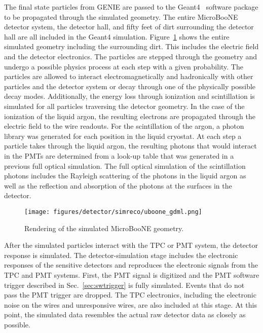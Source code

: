     The final state particles from GENIE are passed to the
    Geant4~\cite{Agostinelli:2002hh} software package to be propagated through
    the simulated geometry.  The entire MicroBooNE detector system, the
    detector hall, and fifty feet of dirt surrounding the detector hall are all
    included in the Geant4 simulation. Figure~\ref{fig:uboonegdml} shows the
    entire simulated geometry including the surrounding dirt. This includes the
    electric field and the detector electronics.  The particles are stepped
    through the geometry and undergo a possible physics process at each step
    with a given probability.  The particles are allowed to interact
    electromagnetically and hadronically with other particles and the detector
    system or decay through one of the physically possible decay modes.
    Additionally, the energy loss through ionization and scintillation is
    simulated for all particles traversing the detector geometry. In the case
    of the ionization of the liquid argon, the resulting electrons are
    propagated through the electric field to the wire readouts.  For the
    scintillation of the argon, a photon library was generated for each
    position in the liquid cryostat. At each step a particle takes through the
    liquid argon, the resulting photons that would interact in the PMTs are
    determined from a look-up table that was generated in a previous full
    optical simulation. The full optical simulation of the scintillation
    photons includes the Rayleigh scattering of the photons in the liquid argon
    as well as the reflection and absorption of the photons at the surfaces in
    the detector.

    \begin{figure}[h]
      \centering
      \texttt{[image: figures/detector/simreco/uboone\_gdml.png]}
      \caption{Rendering of the simulated MicroBooNE geometry.}
      \label{fig:uboonegdml}
    \end{figure}

    After the simulated particles interact with the TPC or PMT system, the
    detector response is simulated. The detector-simulation stage includes the
    electronic responses of the sensitive detectors and reproduces the
    electronic signals from the TPC and PMT systems. First, the PMT signal is
    digitized and the PMT software trigger described in
    Sec.~\ref{sec:swtrigger} is fully simulated. Events that do not pass the
    PMT trigger are dropped. The TPC electronics, including the electronic
    noise on the wires and unresponsive wires, are also included at this stage.
    At this point, the simulated data resembles the actual raw detector data as
    closely as possible.

